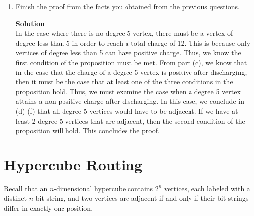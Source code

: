 \documentclass[11pt]{article}
\newcommand*{\Question}[1]{\section{#1}}
\newenvironment{Parts}{\begin{enumerate}[label=(\alph*)]}{\end{enumerate}}
\newcommand*{\Part}{\item}
\newenvironment{Answer}{\vspace{10pt}\begin{mdframed}\textbf{Solution}\\}{\end{mdframed}\vfill\pagebreak[3]}
\newenvironment{Answer}{\vspace{10pt}}{\vfill\pagebreak[3]}
\begin{document}
\begin{Parts}
\Part Finish the proof from the facts you obtained from the previous
  questions.

\begin{Answer}
In the case where there is no degree 5 vertex, there must be a vertex of degree less than 5 in order to reach a total charge of 12. This is because only vertices of degree less than 5 can have positive charge. Thus, we know the first condition of the proposition must be met. From part (c), we know that in the case that the charge of a degree 5 vertex is positive after discharging, then it must be the case that at least one of the three conditions in the proposition hold. Thus, we must examine the case when a degree 5 vertex attains a non-positive charge after discharging. In this case, we conclude in (d)-(f) that all degree 5 vertices would have to be adjacent. If we have at least 2 degree 5 vertices that are adjacent, then the second condition of the proposition will hold. This concludes the proof.
\end{Answer}

\end{Parts}


\Question{Hypercube Routing}

Recall that an $n$-dimensional hypercube contains $2^n$ vertices, each labeled
with a distinct $n$ bit string, and two vertices are adjacent if and only if
their bit strings differ in exactly one position.
\end{document}
